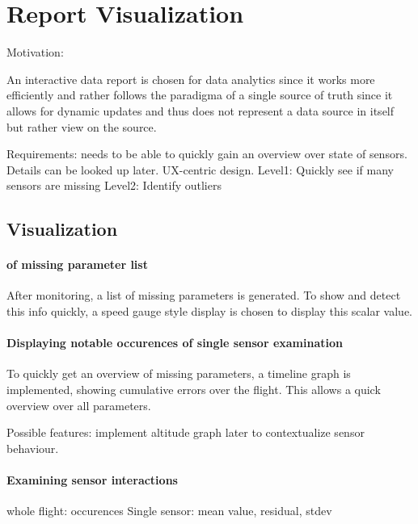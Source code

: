 \section{Report Visualization}

Motivation:


An interactive data report is chosen for data analytics since it works more efficiently and rather follows the paradigma of a single source of truth since it allows for dynamic updates and thus does not represent a data source in itself but rather view on the source.


Requirements:
needs to be able to quickly gain an overview over state of sensors. Details can be looked up later. UX-centric design.
Level1: Quickly see if many sensors are missing
Level2: Identify outliers

\subsection{Visualization}

\paragraph{of missing parameter list}
After monitoring, a list of missing parameters is generated. To show and detect this info quickly, a speed gauge style display is chosen to display this scalar value.

\paragraph{Displaying notable occurences of single sensor examination}
To quickly get an overview of missing parameters, a timeline graph is implemented, showing cumulative errors over the flight. This allows a quick overview over all parameters.


Possible features: implement altitude graph later to contextualize sensor behaviour.

\paragraph{Examining sensor interactions}

whole flight: occurences
Single sensor: mean value, residual, stdev




